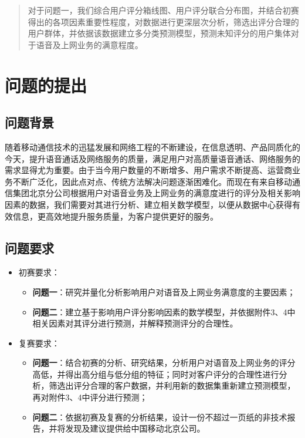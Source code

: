 \documentclass{MathorCupmodeling}
\begin{document}
	\begin{abstract}
		对于问题一，我们综合用户评分箱线图、用户评分联合分布图，并结合初赛得出的各项因素重要性程度，对数据进行更深层次分析，筛选出评分合理的用户群体，并依据该数据建立多分类预测模型，预测未知评分的用户集体对于语音及上网业务的满意程度。
	\end{abstract}

	\pagestyle{empty}
	\tableofcontents
	\newpage
	\pagestyle{fancy}

	\setcounter{page}{1}
	\section{问题的提出}
	\subsection{问题背景}
	随着移动通信技术的迅猛发展和网络工程的不断建设，在信息透明、产品同质化的今天，提升语音通话及网络服务的质量，满足用户对高质量语音通话、网络服务的需求显得尤为重要。由于当今用户数量的不断增多、用户需求不断提高、运营商业务不断广泛化，因此点对点、传统方法解决问题逐渐困难化。而现在有来自移动通信集团北京分公司根据用户对语音业务及上网业务的满意度进行的评分及相关影响因素的数据，我们需要对其进行分析、建立相关数学模型，以便从数据中心获得有效信息，更高效地提升服务质量，为客户提供更好的服务。
	\subsection{问题要求}
	\begin{itemize}
		\item 初赛要求：
		\begin{itemize}
			\item \textbf{问题一}：研究并量化分析影响用户对语音及上网业务满意度的主要因素；
			\item \textbf{问题二}：建立基于影响用户评分影响因素的数学模型，并依据附件3、4中相关因素对其评分进行预测，并解释预测评分的合理性。
		\end{itemize}
		\item 复赛要求：
		\begin{itemize}
			\item \textbf{问题一}：结合初赛的分析、研究结果，分析用户对语音及上网业务的评分高低，并得出高分组与低分组的特征；同时对客户评分的合理性进行分析，筛选出评分合理的客户数据，并利用新的数据集重新建立预测模型，再对附件3、4中评分进行预测；
			\item \textbf{问题二}：依据初赛及复赛的分析结果，设计一份不超过一页纸的非技术报告，并将发现及建议提供给中国移动北京公司。
		\end{itemize}
	\end{itemize}
\end{document}
